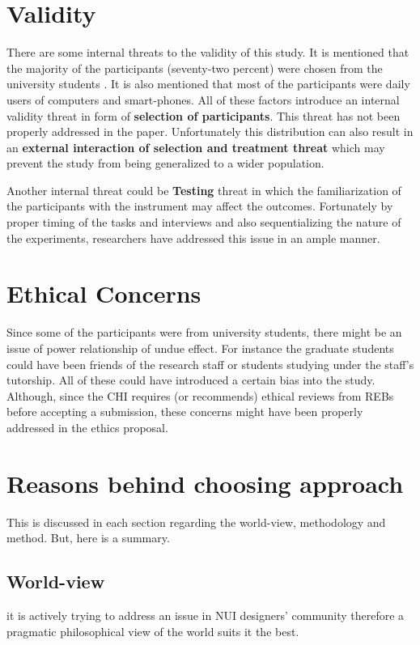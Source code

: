 \documentclass{sigchi}
\begin{document}
\section{Validity}
There are some internal threats to the validity of this study. It is mentioned that the majority of the participants (seventy-two percent) were chosen from the university students \cite{10.1093/iwc/iwv003}. It is also mentioned that most of the participants were daily users of computers and smart-phones. All of these factors introduce an internal validity threat in form of \textbf{selection of participants}. This threat has not been properly addressed in the paper. Unfortunately this distribution can also result in an \textbf{external interaction of selection and treatment threat} which may prevent the study from being generalized to a wider population.

Another internal threat could be \textbf{Testing} threat in which the familiarization of the participants with the instrument may affect the outcomes\cite{creswell2018research}. Fortunately by proper timing of the tasks and interviews and also sequentializing the nature of the experiments, researchers have addressed this issue in an ample manner.

\section{Ethical Concerns}
Since some of the participants were from university students, there might be an issue of power relationship of undue effect. For instance the graduate students could have been friends of the research staff or students studying under the staff's tutorship. All of these could have introduced a certain bias into the study. Although, since the CHI requires (or recommends) ethical reviews from REBs before accepting a submission, these concerns might have been properly addressed in the ethics proposal.

\section{Reasons behind choosing approach}
This is discussed in each section regarding the world-view, methodology and method. But, here is a summary. 
\subsection{World-view}
it is actively trying to address an issue in NUI designers' community therefore a pragmatic philosophical view of the world suits it the best. 
\end{document}
